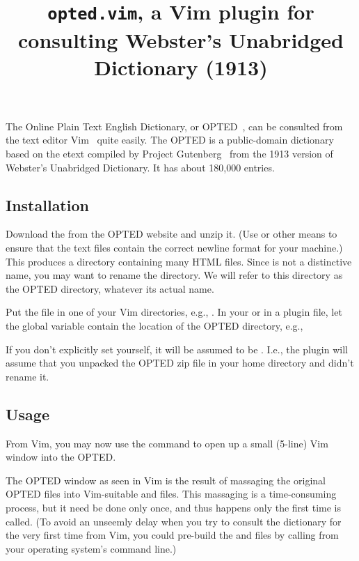 



\title{{\tt\bf opted.vim}, 
a Vim plugin for consulting
Webster's Unabridged Dictionary (1913)}

\smallskip

\centerline{}
\centerline{}

\bigskip

The Online Plain Text English Dictionary, or
OPTED~\cite{opted}, can be consulted from the text
editor Vim~\cite{vim} quite easily.  The OPTED is a
public-domain dictionary based on the etext compiled by
Project Gutenberg~\cite{projgutenberg} from the
1913 version of Webster's Unabridged Dictionary.  It
has about 180,000 entries.

\subsection*{Installation}

Download the
from the OPTED website and unzip
it.  (Use  or other means to ensure that the text files
contain the correct newline format for your machine.)
This produces a directory  containing many HTML
files.  Since  is not a distinctive name, you
may want to rename the directory.  We will refer
to this directory as the OPTED directory, whatever its
actual name.

Put the file  in one of your Vim
 directories, e.g., .
In your  or in a plugin file, let the global
variable  contain 
the
location of the OPTED directory, e.g.,


If you don't explicitly set  yourself, it will be assumed
to be .  I.e., the plugin will assume that you unpacked the
OPTED zip file in your home directory and didn't rename it. 

\subsection*{Usage}

From Vim, you may now use the command  to open up 
a small (5-line) Vim window into the OPTED.

The OPTED window as seen in Vim is the result of
massaging the original OPTED files into Vim-suitable
 and  files.  This massaging is a
time-consuming process, but it need be done only once,
and thus happens only the first time
 is called.
(To avoid an unseemly delay when 
you try to consult the dictionary for the very first time
from Vim, you could pre-build the  and 
files by calling  from your
operating system's
command line.)

